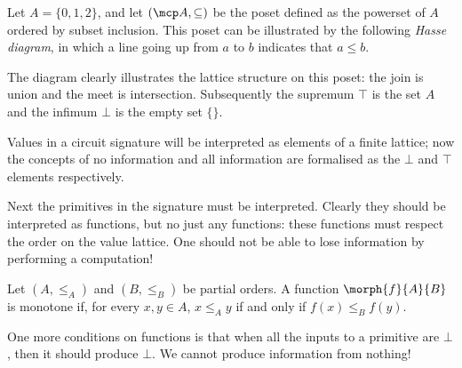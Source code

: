 \begin{example}\label{ex:powerset-lattice}
    Let \(A = \{0,1,2\}\), and let \((\mcp A, \subseteq)\) be the poset defined
    as the powerset of \(A\) ordered by subset inclusion.
    This poset can be illustrated by the following \emph{Hasse diagram}, in
    which a line going up from \(a\) to \(b\) indicates that \(a \leq b\).

    \begin{center}
    \end{center}

    The diagram clearly illustrates the lattice structure on this poset: the
    join is union and the meet is intersection.
    Subsequently the supremum \(\top\) is the set \(A\) and the
    infimum \(\bot\) is the empty set \(\{\}\).
\end{example}

Values in a circuit signature will be interpreted as elements of a finite
lattice; now the concepts of no information and all information are formalised
as the \(\bot\) and \(\top\) elements respectively.

Next the primitives in the signature must be interpreted.
Clearly they should be interpreted as functions, but no just any functions:
these functions must respect the order on the value lattice.
One should not be able to lose information by performing a computation!

\begin{definition}
    Let \((A, \leq_A)\) and \((B, \leq_B)\) be partial orders.
    A function \(\morph{f}{A}{B}\) is monotone if, for every \(x, y \in A\),
    \(x \leq_A y\) if and only if \(f(x) \leq_B f(y)\).
\end{definition}

One more conditions on functions is that when all the inputs to a primitive are
\(\bot\), then it should produce \(\bot\).
We cannot produce information from nothing!

